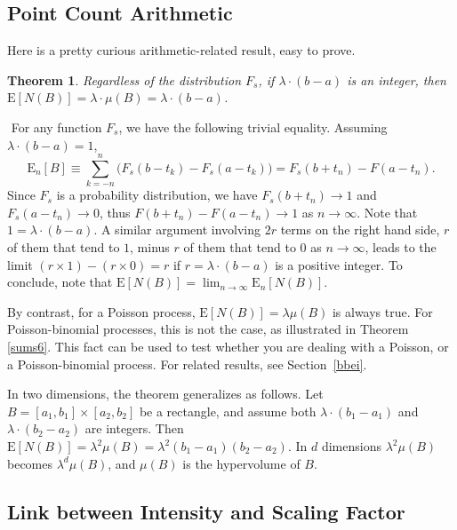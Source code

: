 \documentclass[10pt]{article}
\newtheorem{theorem}{Theorem}[section]
\newenvironment{proof}[1][Proof]{\begin{trivlist}
\item[\hskip \labelsep {\bfseries #1}]}{\end{trivlist}}
\newcommand{\qed}{\nobreak \ifvmode \relax \else
      \ifdim\lastskip<1.5em \hskip-\lastskip
      \hskip1.5em plus0em minus0.5em \fi \nobreak
      \vrule height0.75em width0.5em depth0.25em\fi}
\begin{document}
\subsection{Point Count Arithmetic}\label{pca23}

Here is a pretty curious arithmetic-related result, easy to prove.

\begin{theorem}
\label{combiexp}
Regardless of the distribution $F_s$, if $\lambda\cdot(b-a)$ is an integer, then $\mbox{E}[N(B)]=\lambda\cdot\mu(B)=\lambda\cdot(b-a)$.
\end{theorem}
\begin{proof}
$ $ \newline
For any function $F_s$, we have the following trivial equality. Assuming $\lambda\cdot(b-a)=1$,
$$\mbox{E}_n[B]\equiv \sum_{k=-n}^n \Big(F_s(b-t_k)-F_s(a-t_k)\Big)=F_s(b+t_n)-F(a-t_n).$$
Since $F_s$ is a probability distribution, we have $F_s(b+t_n)\rightarrow 1$ and $F_s(a-t_n)\rightarrow 0$, thus $F(b+t_n)-F(a-t_n)\rightarrow 1$ as $n\rightarrow\infty$. Note that $1=\lambda\cdot(b-a)$. A similar argument involving $2r$ terms on the right hand side, $r$ of them that tend to $1$, minus $r$ of them that tend to $0$ as $n\rightarrow\infty$, leads to the limit $(r\times 1) - (r \times 0) = r$ if $r=\lambda\cdot(b-a)$ is a positive integer. To conclude, note that $\mbox{E}[N(B)]=\lim_{n\rightarrow\infty} \mbox{E}_n[N(B)]$. \qed
\end{proof}

By contrast, for a Poisson process, $\mbox{E}[N(B)]=\lambda\mu(B)$ is always true. For Poisson-binomial processes, this is not the case, as illustrated in Theorem \ref{sums6}. This fact can be used to test whether you are dealing with a Poisson, or a Poisson-binomial process. For related results, see Section~\ref{bbei}.

In two dimensions, the theorem generalizes as follows. Let $B=[a_1, b_1] \times [a_2, b_2]$ be a rectangle, and assume both $\lambda\cdot(b_1-a_1)$ and  $\lambda\cdot(b_2-a_2)$ are integers.
Then $\mbox{E}[N(B)]=\lambda^2\mu(B)=\lambda^2(b_1-a_1)(b_2-a_2)$. In $d$ dimensions $\lambda^2\mu(B)$ becomes
$\lambda^d\mu(B)$,  and $\mu(B)$ is the hypervolume of $B$.

\subsection{Link between Intensity and Scaling Factor}\label{liisc}
\end{document}
